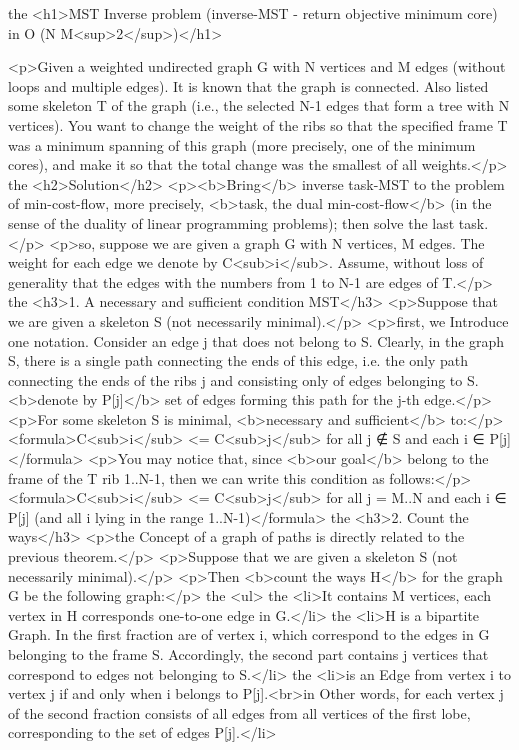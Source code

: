 the <h1>MST Inverse problem (inverse-MST - return objective minimum core) in O (N M<sup>2</sup>)</h1>

<p>Given a weighted undirected graph G with N vertices and M edges (without loops and multiple edges). It is known that the graph is connected. Also listed some skeleton T of the graph (i.e., the selected N-1 edges that form a tree with N vertices). You want to change the weight of the ribs so that the specified frame T was a minimum spanning of this graph (more precisely, one of the minimum cores), and make it so that the total change was the smallest of all weights.</p>
the <h2>Solution</h2>
<p><b>Bring</b> inverse task-MST to the problem of min-cost-flow, more precisely, <b>task, the dual min-cost-flow</b> (in the sense of the duality of linear programming problems); then solve the last task.</p>
<p>so, suppose we are given a graph G with N vertices, M edges. The weight for each edge we denote by C<sub>i</sub>. Assume, without loss of generality that the edges with the numbers from 1 to N-1 are edges of T.</p>
the <h3>1. A necessary and sufficient condition MST</h3>
<p>Suppose that we are given a skeleton S (not necessarily minimal).</p>
<p>first, we Introduce one notation. Consider an edge j that does not belong to S. Clearly, in the graph S, there is a single path connecting the ends of this edge, i.e. the only path connecting the ends of the ribs j and consisting only of edges belonging to S. <b>denote by P[j]</b> set of edges forming this path for the j-th edge.</p>
<p>For some skeleton S is minimal, <b>necessary and sufficient</b> to:</p>
<formula>C<sub>i</sub> <= C<sub>j</sub> for all j ∉ S and each i ∈ P[j]</formula>
<p>You may notice that, since <b>our goal</b> belong to the frame of the T rib 1..N-1, then we can write this condition as follows:</p>
<formula>C<sub>i</sub> <= C<sub>j</sub> for all j = M..N and each i ∈ P[j]
(and all i lying in the range 1..N-1)</formula>
the <h3>2. Count the ways</h3>
<p>the Concept of a graph of paths is directly related to the previous theorem.</p>
<p>Suppose that we are given a skeleton S (not necessarily minimal).</p>
<p>Then <b>count the ways H</b> for the graph G be the following graph:</p>
the <ul>
the <li>It contains M vertices, each vertex in H corresponds one-to-one edge in G.</li>
the <li>H is a bipartite Graph. In the first fraction are of vertex i, which correspond to the edges in G belonging to the frame S. Accordingly, the second part contains j vertices that correspond to edges not belonging to S.</li>
the <li>is an Edge from vertex i to vertex j if and only when i belongs to P[j].<br>in Other words, for each vertex j of the second fraction consists of all edges from all vertices of the first lobe, corresponding to the set of edges P[j].</li>
